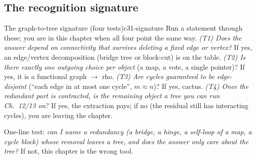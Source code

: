 \subsection{The recognition signature}

\begin{definition}{The graph-to-tree signature (four tests)}{c31-signature}
Run a statement through these; you are in this chapter when all four point the same way.
\emph{(T1) Does the answer depend on connectivity that survives deleting a fixed edge or
vertex?} If yes, an edge/vertex decomposition (bridge tree or block-cut) is on the table.
\emph{(T2) Is there exactly one outgoing choice per object} (a map, a vote, a single
pointer)? If yes, it is a functional graph \(\to\) rho.
\emph{(T3) Are cycles guaranteed to be edge-disjoint} (``each edge in at most one cycle'',
\(m\approx n\))? If yes, cactus.
\emph{(T4) Once the redundant part is contracted, is the remaining object a tree you can
run Ch.~12/13 on}? If yes, the extraction pays; if no (the residual still has interacting
cycles), you are leaving the chapter.
\end{definition}

\begin{recognitionbox}
One-line test: \emph{can I name a redundancy (a bridge, a hinge, a self-loop of a map,
a cycle block) whose removal leaves a tree, and does the answer only care about the
tree?} If not, this chapter is the wrong tool.
\end{recognitionbox}

